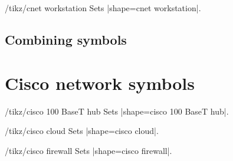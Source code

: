 \documentclass[a4paper]{ltxdoc}
\begin{document}
\begin{stylekey}{/tikz/cnet workstation}
Sets |shape={cnet workstation}|.
\begin{codeexample}[preamble={\usetikzlibrary{shapes.cnet.workstation}}]
\end{codeexample}
\end{stylekey}

\subsection{Combining symbols}
\label{sec: combining-symbols}

\begin{codeexample}[preamble={\usetikzlibrary{shapes.cnet.car}}]
\end{codeexample}

\begin{codeexample}[preamble={\usetikzlibrary{shapes.cnet.smartphone}}]
\end{codeexample}


\section{Cisco network symbols}
\label{sec:cisco-network-symbols}

\begin{stylekey}{/tikz/cisco 100 BaseT hub}
Sets |shape={cisco 100 BaseT hub}|.
\begin{codeexample}[preamble={\usetikzlibrary{shapes.cisco.100basethub}}]
\end{codeexample}
\end{stylekey}

\begin{stylekey}{/tikz/cisco cloud}
Sets |shape={cisco cloud}|.
\begin{codeexample}[preamble={\usetikzlibrary{shapes.cisco.cloud}}]
\end{codeexample}
\end{stylekey}

\begin{stylekey}{/tikz/cisco firewall}
Sets |shape={cisco firewall}|.
\begin{codeexample}[preamble={\usetikzlibrary{shapes.cisco.firewall}}]
\end{codeexample}
\end{stylekey}
\end{document}
